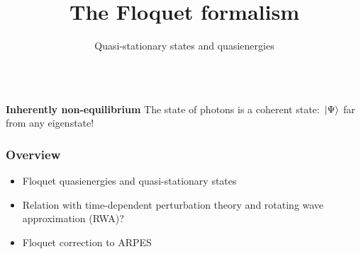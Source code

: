 \documentclass[t]{beamer}
\begin{document}
\begin{frame}
\begin{columns}
\begin{column}{0.3\textwidth}
\begin{center}
\begin{tikzpicture}[x=0.75pt,y=0.75pt,yscale=-0.5,xscale=0.5]
        
        \end{tikzpicture}        
\end{center} 
\end{column}

\end{columns}

\vspace{0.25cm}

\textbf{Inherently non-equilibrium} The state of photons is a coherent state: $\ket*{\Psi}$ far from any eigenstate!

\end{frame}

\begin{frame}
\frametitle{Overview}

\begin{itemize}
    \item Floquet quasienergies and quasi-stationary states 
    \item Relation with time-dependent perturbation theory and rotating wave approximation (RWA)?
    \item Floquet correction to ARPES 
\end{itemize}

\end{frame}

\begingroup

\title{The Floquet formalism}
\subtitle{Quasi-stationary states and quasienergies}
\author{}
\date{}

\begin{frame}
    \titlepage
\end{frame}
\end{document}
